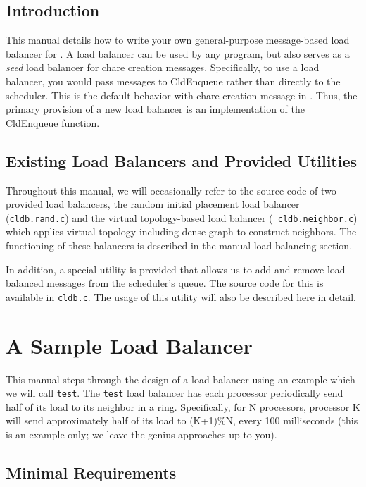 \subsection{Introduction}

This manual details how to write your own general-purpose
message-based load balancer for \converse{}.
A \converse{} load balancer can be used by any \converse{} program, but also
serves as a {\sl seed} load balancer for \charmpp{} chare creation messages.
Specifically, to use a load balancer, you would pass messages to
CldEnqueue rather than directly to the scheduler.  This is the default
behavior with chare creation message in \charmpp{}.  Thus, the primary
provision of a new load balancer is an implementation of the
CldEnqueue function.

\subsection{Existing Load Balancers and Provided Utilities}

Throughout this manual, we will occasionally refer to the source code
of two provided load balancers, the random initial placement load balancer
({\tt cldb.rand.c}) and the virtual topology-based load balancer ({\tt
cldb.neighbor.c}) which applies virtual topology including dense graph to 
construct neighbors.  The functioning of these balancers is described in
the \charmpp{} manual load balancing section.

In addition, a special utility is provided that allows us to add and
remove load-balanced messages from the scheduler's queue.  The source
code for this is available in {\tt cldb.c}.  The usage of this utility
will also be described here in detail.

\section{A Sample Load Balancer}

This manual steps through the design of a load balancer using an
example which we will call {\tt test}.  The {\tt test} load balancer
has each processor periodically send half of its load to its neighbor
in a ring.  Specifically, for N processors, processor K will send
approximately half of its load to (K+1)\%N, every 100 milliseconds
(this is an example only; we leave the genius approaches up to you).

\subsection{Minimal Requirements}

